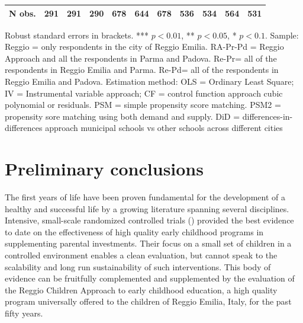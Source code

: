 \documentclass[12pt]{article}
\begin{document}
\begin{table}[ht]
\begin{center}
\begin{adjustbox}{width=1.2\textwidth,center=\textwidth}
\begin{tabular}{l*{10}{c}}
\hline
N obs. &  291 & 291 & 290 & 678 & 644 & 678 & 536 & 534 & 564 & 531 \\
\hline
\end{tabular}
\end{adjustbox}
\end{center}
\par

\vspace{1ex}
\par



{\footnotesize \raggedright{Robust standard errors in brackets. *** $p<0.01$, ** $p<0.05$, * $p<0.1$. Sample: Reggio = only respondents in the city of Reggio Emilia. RA-Pr-Pd = Reggio Approach and all the respondents in Parma and Padova. Re-Pr= all of the respondents in Reggio Emilia and Parma. Re-Pd= all of the respondents in Reggio Emilia and Padova. Estimation method: OLS = Ordinary Least Square; IV = Instrumental variable approach; CF = control function approach cubic polynomial or residuals. PSM = simple propensity score matching. PSM2 = propensity sore matching using both demand and supply. DiD = differences-in-differences approach municipal schools vs other schools across different cities} }
\end{table}


\section{Preliminary conclusions} \label{sec:conclusion}

The first years of life have been proven fundamental for the development of a healthy and successful life by a growing literature spanning several disciplines. Intensive, small-scale randomized controlled trials (\cite{Heckman2013a,Campbell2014,Gertler2014}) provided the best evidence to date on the effectiveness of high quality early childhood programs in supplementing parental investments. Their focus on a small set of children in a controlled environment enables a clean evaluation, but cannot speak to the scalability and long run sustainability of such interventions. This body of evidence can be fruitfully complemented and supplemented by the evaluation of the Reggio Children Approach to early childhood education, a high quality program universally offered to the children of Reggio Emilia, Italy, for the past fifty years.
\end{document}
